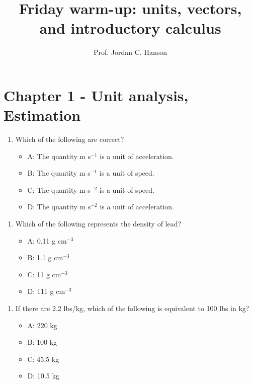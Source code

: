 \documentclass{article}
\begin{document}
\twocolumn

\title{Friday warm-up: units, vectors, and introductory calculus}
\author{Prof. Jordan C. Hanson}

\maketitle

\section{Chapter 1 - Unit analysis, \\ Estimation}

\begin{enumerate}
\item Which of the following are correct?
\begin{itemize}
\item A: The quantity m s$^{-1}$ is a unit of acceleration.
\item B: The quantity m s$^{-1}$ is a unit of speed.
\item C: The quantity m s$^{-2}$ is a unit of speed.
\item D: The quantity m s$^{-2}$ is a unit of acceleration.
\end{itemize}
\end{enumerate}

\begin{enumerate}
\item Which of the following represents the density of lead?
\begin{itemize}
\item A: 0.11 g cm$^{-3}$
\item B: 1.1 g cm$^{-3}$
\item C: 11 g cm$^{-3}$
\item D: 111 g cm$^{-3}$
\end{itemize}
\end{enumerate}

\begin{enumerate}
\item If there are 2.2 lbs/kg, which of the following is equivalent to 100 lbs in kg?
\begin{itemize}
\item A: 220 kg
\item B: 100 kg
\item C: 45.5 kg
\item D: 10.5 kg
\end{itemize}
\end{enumerate}
\end{document}
